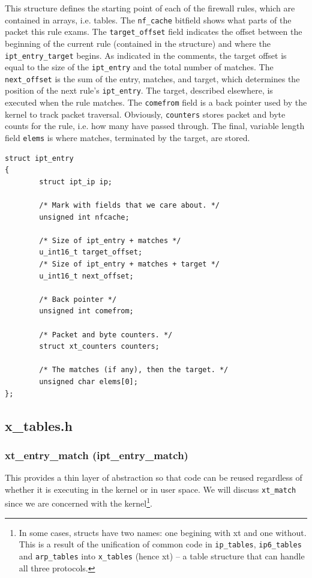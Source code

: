 \documentclass[a4paper,10pt]{article}
\newcommand{\code}[1]{\texttt{{#1}}}
\begin{document}
This structure defines the starting point of each of the firewall
rules, which are contained in arrays, i.e. tables.  The
\code{nf\_cache} bitfield shows what parts of the packet this rule
exams. The \code{target\_offset} field indicates the offset between
the beginning of the current rule (contained in the structure) and
where the \code{ipt\_entry\_target} begins. As indicated in the
comments, the target offset is equal to the size of the
\code{ipt\_entry} and the total number of matches. The
\code{next\_offset} is the sum of the entry, matches, and target,
which determines the position of the next rule's
\code{ipt\_entry}. The target, described elsewhere, is executed when
the rule matches. The \code{comefrom} field is a back pointer used by
the kernel to track packet traversal. Obviously, \code{counters}
stores packet and byte counts for the rule, i.e. how many have passed
through. The final, variable length field \code{elems} is where matches,
terminated by the target, are stored.

\begin{lstlisting}
struct ipt_entry
{
        struct ipt_ip ip;

        /* Mark with fields that we care about. */
        unsigned int nfcache;

        /* Size of ipt_entry + matches */
        u_int16_t target_offset;
        /* Size of ipt_entry + matches + target */
        u_int16_t next_offset;

        /* Back pointer */
        unsigned int comefrom;

        /* Packet and byte counters. */
        struct xt_counters counters;

        /* The matches (if any), then the target. */
        unsigned char elems[0];
};
\end{lstlisting}

\subsection{x\_tables.h}

\subsubsection{xt\_entry\_match (ipt\_entry\_match)}

This provides a thin layer of abstraction so that code can be reused
regardless of whether it is executing in the kernel or in user
space. We will discuss \code{xt\_match} since we are concerned with
the kernel\footnote{In some cases, structs have two names: one begining with xt and one
without. This is a result of the unification of common code in
\code{ip\_tables}, \code{ip6\_tables} and \code{arp\_tables} into \code{x\_tables} (hence xt) -- a table
structure that can handle all three protocols.}.
\end{document}
